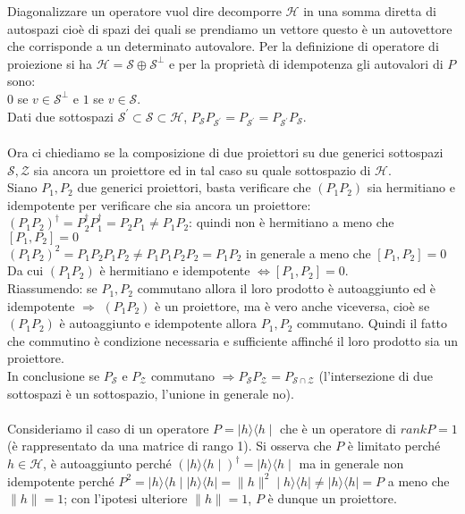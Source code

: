 Diagonalizzare un operatore vuol dire decomporre $\mathcal{H}$ in una somma diretta di autospazi cioè di spazi dei quali se prendiamo un vettore questo è un autovettore che corrisponde a un determinato autovalore.
Per la definizione di operatore di proiezione si ha $\mathcal{H} = \mathcal{S} \oplus \mathcal{S^{\perp}}$ e per la proprietà di idempotenza gli autovalori di $P$ sono: \\ $0$ se $v \in \mathcal{S^{\perp}}$ e $1$ se $v \in \mathcal{S}$.\\
Dati due sottospazi $\mathcal{S^{'}} \subset \mathcal{S} \subset \mathcal{H}$, $P_{\mathcal{S}}P_{\mathcal{S^{'}} } = P_{\mathcal{S^{'}}} = P_{\mathcal{S^{'}} }P_{\mathcal{S}}$.\\ \\
Ora ci chiediamo se la composizione di due proiettori su due generici sottospazi $\mathcal{S}, \mathcal{Z}$ sia ancora un proiettore ed in tal caso su quale sottospazio di $\mathcal{H}$.\\ Siano $P_{1}, P_{2}$ due generici proiettori, basta verificare che $(P_{1}P_{2})$ sia hermitiano e idempotente per verificare che sia ancora un proiettore:\\
$(P_{1}P_{2})^{\dag} = P_{2}^{\dag}P_{1}^{\dag} = P_{2}P_{1} \neq P_{1}P_{2}$: quindi non è hermitiano a meno che $[P_{1},P_{2}]=0$\\
$(P_{1}P_{2})^{2}=P_{1}P_{2}P_{1}P_{2} \neq P_{1}P_{1}P_{2}P_{2} = P_{1}P_{2} $ in generale a meno che $[P_{1},P_{2}]=0$\\
Da cui $(P_{1}P_{2})$ è hermitiano e idempotente $\Leftrightarrow [P_{1},P_{2}]=0$.\\
Riassumendo: se $P_{1},P_{2}$ commutano allora il loro prodotto è autoaggiunto ed è idempotente $\Rightarrow$ $(P_{1}P_{2})$ è un proiettore, ma è vero anche viceversa, cioè se $(P_{1}P_{2})$ è autoaggiunto e idempotente allora $P_{1},P_{2}$ commutano. Quindi il fatto che commutino è condizione necessaria e sufficiente affinché il loro prodotto sia un proiettore.\\ 
In conclusione se $P_{\mathcal{S}}$ e $P_{\mathcal{Z}}$ commutano $\Rightarrow P_{\mathcal{S}}P_{\mathcal{Z}}=P_{\mathcal{S}\cap \mathcal{Z}}$ (l'intersezione di due sottospazi è un sottospazio, l'unione in generale no).\\ \\
Consideriamo il caso di un operatore $P= \mid h \rangle \langle h \mid$ che è un operatore di $rankP=1$ (è rappresentato da una matrice di rango 1). Si osserva che $P$ è limitato perché $h \in \mathcal{H}$, è autoaggiunto perché $(\mid h \rangle \langle h \mid)^{\dag}=\mid h \rangle \langle h \mid$ ma in generale non idempotente perché $P^{2}= \mid h \rangle \langle h \mid \mid h \rangle \langle h \mid = \parallel h \parallel ^{2} \mid h \rangle \langle h \mid \neq \mid h \rangle \langle h \mid =P$ a meno che $\parallel h \parallel = 1$; con l'ipotesi ulteriore $\parallel h \parallel = 1$, $P$ è dunque un proiettore.\\
